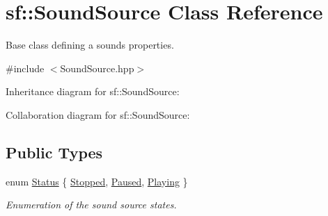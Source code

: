 \hypertarget{classsf_1_1_sound_source}{}\section{sf\+:\+:Sound\+Source Class Reference}
\label{classsf_1_1_sound_source}


Base class defining a sound\textquotesingle{}s properties.  




{\ttfamily \#include $<$Sound\+Source.\+hpp$>$}



Inheritance diagram for sf\+:\+:Sound\+Source\+:


Collaboration diagram for sf\+:\+:Sound\+Source\+:
\subsection*{Public Types}
\begin{DoxyCompactItemize}
\item 
enum \hyperlink{classsf_1_1_sound_source_ac43af72c98c077500b239bc75b812f03}{Status} \{ \hyperlink{classsf_1_1_sound_source_ac43af72c98c077500b239bc75b812f03adabb01e8aa85b2f54b344890addf764a}{Stopped}, 
\hyperlink{classsf_1_1_sound_source_ac43af72c98c077500b239bc75b812f03ac3ca1fcc0394267c9bdbe3dc0a8a7e41}{Paused}, 
\hyperlink{classsf_1_1_sound_source_ac43af72c98c077500b239bc75b812f03af07bdea9f70ef7606dfc9f955beeee18}{Playing}
 \}\begin{DoxyCompactList}\small\item\em Enumeration of the sound source states. \end{DoxyCompactList}
\end{DoxyCompactItemize}
